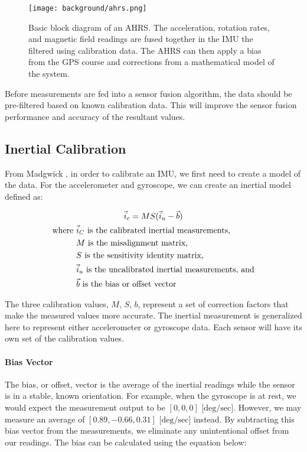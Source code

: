 \begin{figure}[h!]
    \caption[AHRS block diagram]{Basic block diagram of an AHRS. 
    The acceleration, rotation rates, and magnetic field readings are fused together in the IMU the filtered using calibration data. 
    The AHRS can then apply a bias from the GPS course and corrections from a mathematical model of the system.}
    \centering
    \texttt{[image: background/ahrs.png]}
\end{figure}

Before measurements are fed into a sensor fusion algorithm, the data should be pre-filtered based on known calibration data.
This will improve the sensor fusion performance and accuracy of the resultant values.

\subsection{Inertial Calibration}

From Madgwick \cite{Madgwick:dissertation}, in order to calibrate an IMU, we first need to create a model of the data. For the accelerometer and gyroscope, we can create an inertial model defined as:

\begin{gather} \labeq{inertial_model}
    \vec{i}_c=MS(\vec{i}_u-\vec{b}) \\
    \begin{aligned}
        \text{where } & \vec{i}_C \text{ is the calibrated inertial measurements,} \\ 
        & M \text{ is the misalignment matrix,} \\
        & S \text{ is the sensitivity identity matrix,} \\
        & \vec{i}_u \text{ is the uncalibrated inertial measurements, and} \\
        & \vec{b} \text{ is the bias or offset vector}
    \end{aligned} \notag
\end{gather}

The three calibration values, $M$, $S$, $b$, represent a set of correction factors that make the measured values more accurate. The inertial measurement is generalized here to represent either accelerometer or gyroscope data. Each sensor will have its own set of the calibration values.

\paragraph*{Bias Vector} The bias, or offset, vector is the average of the inertial readings while the sensor is in a stable, known orientation. For example, when the gyroscope is at rest, we would expect the measurement output to be $[0,0,0] \text{ [deg/sec]}$. However, we may measure an average of $[0.89, -0.66, 0.31] \text{ [deg/sec]}$ instead. By subtracting this bias vector from the measurements, we eliminate any unintentional offset from our readings. The bias can be calculated using the equation below:

